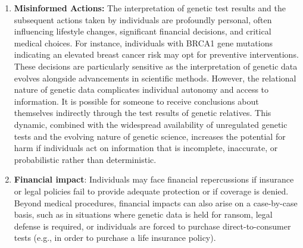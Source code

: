 \begin{enumerate}
    \item \textbf{Misinformed Actions: } The interpretation of genetic test results and the subsequent actions taken by individuals are profoundly personal, often influencing lifestyle changes, significant financial decisions, and critical medical choices. For instance, individuals with BRCA1 gene mutations indicating an elevated breast cancer risk may opt for preventive interventions. These decisions are particularly sensitive as the interpretation of genetic data evolves alongside advancements in scientific methods. However, the relational nature of genetic data complicates individual autonomy and access to information. It is possible for someone to receive conclusions about themselves indirectly through the test results of genetic relatives. This dynamic, combined with the widespread availability of unregulated genetic tests and the evolving nature of genetic science, increases the potential for harm if individuals act on information that is incomplete, inaccurate, or probabilistic rather than deterministic.
  


    \item \textbf{Financial impact}: Individuals may face financial repercussions if insurance or legal policies fail to provide adequate protection or if coverage is denied. Beyond medical procedures, financial impacts can also arise on a case-by-case basis, such as in situations where genetic data is held for ransom, legal defense is required, or individuals are forced to purchase direct-to-consumer tests (e.g., in order to purchase a life insurance policy).
\end{enumerate}